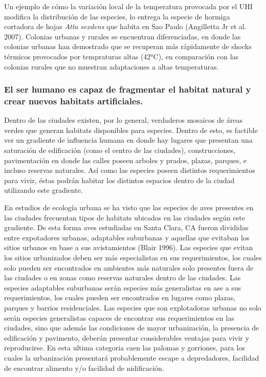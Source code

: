 \documentclass[]{article}
\begin{document}
Un ejemplo de cómo la variación local de la temperatura provocada por el
UHI modifica la distribución de las especies, lo entrega la especie de
hormiga cortadora de hojas \emph{Atta sexdens} que habita en Sao Paulo
(Angilletta Jr et al. 2007). Colonias urbanas y rurales se encuentran
diferenciadas, en donde las colonias urbanas han demostrado que se
recuperan más rápidamente de shocks térmicos provocados por tempraturas
altas (42°C), en comparación con las colonias rurales que no muestran
adaptaciones a altas temperaturas.

\subsubsection{El ser humano es capaz de fragmentar el habitat natural y
crear nuevos habitats
artificiales.}\label{el-ser-humano-es-capaz-de-fragmentar-el-habitat-natural-y-crear-nuevos-habitats-artificiales.}

Dentro de las ciudades existen, por lo general, verdaderos mosaicos de
áreas verdes que generan habitats disponibles para especies. Dentro de
esto, es factible ver un gradiente de influencia humana en donde hay
lugares que presentan una saturación de edificación (como el centro de
las ciudades), construcciones, pavimentación en donde las calles poseen
arboles y prados, plazas, parques, e incluso reservas naturales. Así
como las especies poseen distintos requerimientos para vivir, éstas
podrán habitar los distintos espacios dentro de la ciudad utilizando
este gradiente.

En estudios de ecología urbana se ha visto que las especies de aves
presentes en las ciudades frecuentan tipos de habitats ubicados en las
ciudades según este gradiente. De esta forma aves estudiadas en Santa
Clara, CA fueron divididas entre expotadores urbanas, adaptables
suburbanas y aquellas que evitaban los sitios urbanos en base a sus
avistamientos (Blair 1996). Las especies que evitan los sitios
urbanizados deben ser más especialistas en sus requerimientos, los
cuales solo pueden ser encontrados en ambientes más naturales solo
presentes fuera de las ciudades o en zonas como reservas naturales
dentro de las ciudades. Las especies adaptables suburbanas serán
especies más generalistas en ase a sus requerimientos, los cuales pueden
ser encontrados en lugares como plazas, parques y barrios residenciales.
Las especies que son explotadoras urbanas no solo serán especies
generalistas capaces de encontrar sus requerimientos en las ciudades,
sino que además las condiciones de mayor urbanización, la presencia de
edificación y pavimento, deberán presentar considerables ventajas para
vivir y reproducirse. En esta ultima categoria caen las palomas y
gorriones, para los cuales la urbanización presentará probablemente
escape a depredadores, facilidad de encontrar alimento y/o facilidad de
nidificación.
\end{document}
